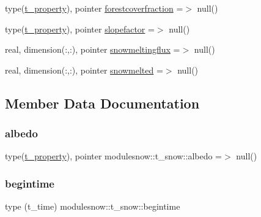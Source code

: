 \begin{DoxyCompactItemize}
\item 
type(\mbox{\hyperlink{structmodulesnow_1_1t__property}{t\+\_\+property}}), pointer \mbox{\hyperlink{structmodulesnow_1_1t__snow_a04001e8c7e922e531e8739f4a4f02c45}{forestcoverfraction}} =$>$ null()
\item 
type(\mbox{\hyperlink{structmodulesnow_1_1t__property}{t\+\_\+property}}), pointer \mbox{\hyperlink{structmodulesnow_1_1t__snow_ab1b80f0da3bab4c62dff36909422a98e}{slopefactor}} =$>$ null()
\item 
real, dimension(\+:,\+:), pointer \mbox{\hyperlink{structmodulesnow_1_1t__snow_a96476cdb591916b1df8edb0990b852c1}{snowmeltingflux}} =$>$ null()
\item 
real, dimension(\+:,\+:), pointer \mbox{\hyperlink{structmodulesnow_1_1t__snow_a05bee8139805c53360ca4023c1cc6e57}{snowmelted}} =$>$ null()
\end{DoxyCompactItemize}


\subsection{Member Data Documentation}
\mbox{\label{structmodulesnow_1_1t__snow_ae7172cbf3819662b17793e019b958944}} 
\subsubsection{\texorpdfstring{albedo}{albedo}}
{\footnotesize\ttfamily type(\mbox{\hyperlink{structmodulesnow_1_1t__property}{t\+\_\+property}}), pointer modulesnow\+::t\+\_\+snow\+::albedo =$>$ null()\hspace{0.3cm}{\ttfamily [private]}}

\mbox{\label{structmodulesnow_1_1t__snow_a8dfcd05aea4ac77d5f31c5b72f01473f}} 
\subsubsection{\texorpdfstring{begintime}{begintime}}
{\footnotesize\ttfamily type (t\+\_\+time) modulesnow\+::t\+\_\+snow\+::begintime\hspace{0.3cm}{\ttfamily [private]}}

